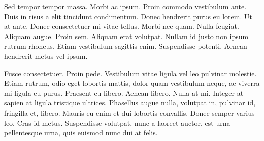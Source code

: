 \documentclass[a4paper, 11pt, draft]{report}
\begin{document}
Sed tempor tempor massa. Morbi ac ipsum. Proin commodo vestibulum ante. Duis in risus a elit tincidunt condimentum. Donec hendrerit purus eu lorem. Ut at ante. Donec consectetuer mi vitae tellus. Morbi nec quam. Nulla feugiat. Aliquam augue. Proin sem. Aliquam erat volutpat. Nullam id justo non ipsum rutrum rhoncus. Etiam vestibulum sagittis enim. Suspendisse potenti. Aenean hendrerit metus vel ipsum.

Fusce consectetuer. Proin pede. Vestibulum vitae ligula vel leo pulvinar molestie. Etiam rutrum, odio eget lobortis mattis, dolor quam vestibulum neque, ac viverra mi ligula eu purus. Praesent eu libero. Aenean libero. Nulla at mi. Integer at sapien at ligula tristique ultrices. Phasellus augue nulla, volutpat in, pulvinar id, fringilla et, libero. Mauris eu enim et dui lobortis convallis. Donec semper varius leo. Cras id metus. Suspendisse volutpat, nunc a laoreet auctor, est urna pellentesque urna, quis euismod nunc dui at felis.
\end{document}
